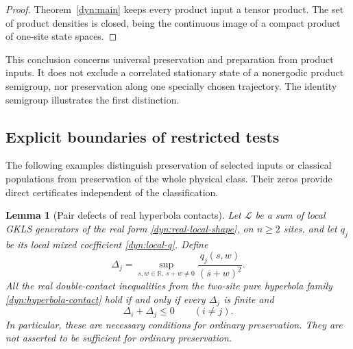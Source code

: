\documentclass[reqno]{amsart}
\newtheorem{lemma}[theorem]{Lemma}
\theoremstyle{definition}
\theoremstyle{remark}
\newcommand{\R}{\mathbb R}
\begin{document}
\begin{proof}
Theorem~\ref{dyn:main} keeps every product input a tensor product.
The set of product densities is closed, being the continuous image of
a compact product of one-site state spaces.
\end{proof}

This conclusion concerns universal preservation and preparation from
product inputs.  It does not exclude a correlated stationary state of a
nonergodic product semigroup, nor preservation along one specially chosen
trajectory.  The identity semigroup illustrates the first distinction.

\subsection{Explicit boundaries of restricted tests}

The following examples distinguish preservation of selected inputs or
classical populations from preservation of the whole physical class.
Their zeros provide direct certificates independent of the classification.

\begin{lemma}[Pair defects of real hyperbola contacts]\label{dyn:pair-defect}
Let $\mathcal L$ be a sum of local GKLS generators of the real form
\eqref{dyn:real-local-shape}, on $n\ge2$ sites, and let $q_j$ be its
local mixed coefficient \eqref{dyn:local-q}.  Define
\[
 \Delta_j=\sup_{s,w\in\R,\ s+w\ne0}
             \frac{q_j(s,w)}{(s+w)^2}.
\]
All the real double-contact inequalities from the two-site pure
hyperbola family \eqref{dyn:hyperbola-contact} hold if and only if
every $\Delta_j$ is finite and
\begin{equation}\label{dyn:pair-defect-condition}
 \Delta_i+\Delta_j\le0\qquad(i\ne j).
\end{equation}
In particular, these are necessary conditions for ordinary preservation.
They are not asserted to be sufficient for ordinary preservation.
\end{lemma}
\end{document}
